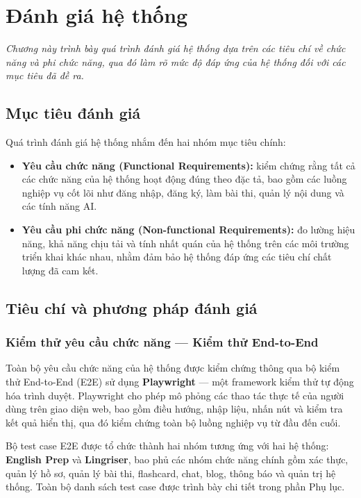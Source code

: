 \chapter{Đánh giá hệ thống}
\textit{Chương này trình bày quá trình đánh giá hệ thống dựa trên các tiêu chí về chức năng và phi chức năng, qua đó làm rõ mức độ đáp ứng của hệ thống đối với các mục tiêu đã đề ra.}

\section{Mục tiêu đánh giá}
Quá trình đánh giá hệ thống nhắm đến hai nhóm mục tiêu chính:

\begin{itemize}
    \item \textbf{Yêu cầu chức năng (Functional Requirements):} kiểm chứng rằng tất cả các chức năng của hệ thống hoạt động đúng theo đặc tả, bao gồm các luồng nghiệp vụ cốt lõi như đăng nhập, đăng ký, làm bài thi, quản lý nội dung và các tính năng AI.
    \item \textbf{Yêu cầu phi chức năng (Non-functional Requirements):} đo lường hiệu năng, khả năng chịu tải và tính nhất quán của hệ thống trên các môi trường triển khai khác nhau, nhằm đảm bảo hệ thống đáp ứng các tiêu chí chất lượng đã cam kết.
\end{itemize}

\section{Tiêu chí và phương pháp đánh giá}

\subsection{Kiểm thử yêu cầu chức năng --- Kiểm thử End-to-End}

Toàn bộ yêu cầu chức năng của hệ thống được kiểm chứng thông qua bộ kiểm thử End-to-End (E2E) sử dụng \textbf{Playwright} \cite{playwright_docs} --- một framework kiểm thử tự động hóa trình duyệt. Playwright cho phép mô phỏng các thao tác thực tế của người dùng trên giao diện web, bao gồm điều hướng, nhập liệu, nhấn nút và kiểm tra kết quả hiển thị, qua đó kiểm chứng toàn bộ luồng nghiệp vụ từ đầu đến cuối.

Bộ test case E2E được tổ chức thành hai nhóm tương ứng với hai hệ thống: \textbf{English Prep} và \textbf{Lingriser}, bao phủ các nhóm chức năng chính gồm xác thực, quản lý hồ sơ, quản lý bài thi, flashcard, chat, blog, thông báo và quản trị hệ thống. Toàn bộ danh sách test case được trình bày chi tiết trong phần Phụ lục.

